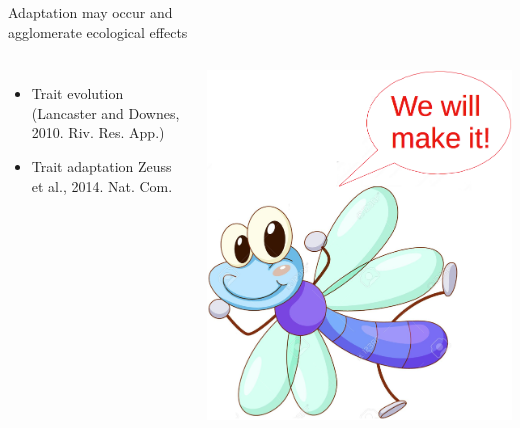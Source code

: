 \documentclass[10pt, compress]{beamer}
\begin{document}

\begin{frame}{Adaptation may occur and\protect\\agglomerate ecological effects}
\begin{columns}
\column{7cm}
\begin{itemize}
\item \alert{Trait evolution} \footnotesize (Lancaster and Downes, 2010. Riv. Res. App.) \normalsize\\
\vspace{0.5cm}
\item \alert{Trait adaptation} \footnotesize Zeuss et al., 2014. Nat. Com.
\end{itemize}
\column{4cm}
\centering
\includegraphics[width=1.1\textwidth]{images/Brave.png}
\end{columns}
\end{frame}


\end{document}
